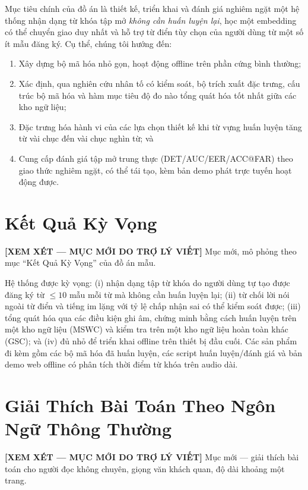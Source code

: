 \documentclass[12pt,a4paper]{report}
\newcommand{\reviewnote}[1]{%
    \par\smallskip\noindent
    \colorbox{yellow!35}{\parbox{0.97\linewidth}{\small\textbf{[XEM XÉT — MỤC MỚI DO TRỢ LÝ VIẾT]}\; #1}}%
    \par\smallskip}
\newcommand{\reviewnote}[1]{}
\begin{document}
Mục tiêu chính của đồ án là thiết kế, triển khai và đánh giá nghiêm ngặt một hệ
thống nhận dạng từ khóa tập mở \emph{không cần huấn luyện lại}, học một embedding
có thể chuyển giao duy nhất và hỗ trợ từ điển tùy chọn của người dùng từ một số
ít mẫu đăng ký. Cụ thể, chúng tôi hướng đến:
\begin{enumerate}[leftmargin=1.5em,itemsep=2pt]
\item Xây dựng bộ mã hóa nhỏ gọn, hoạt động offline trên phần cứng bình thường;
\item Xác định, qua nghiên cứu nhân tố có kiểm soát, bộ trích xuất đặc trưng, cấu
trúc bộ mã hóa và hàm mục tiêu độ đo nào tổng quát hóa tốt nhất giữa các kho ngữ
liệu;
\item Đặc trưng hóa hành vi của các lựa chọn thiết kế khi từ vựng huấn luyện tăng
từ vài chục đến vài chục nghìn từ; và
\item Cung cấp đánh giá tập mở trung thực (DET/AUC/EER/ACC@FAR) theo giao thức
nghiêm ngặt, có thể tái tạo, kèm bản demo phát trực tuyến hoạt động được.
\end{enumerate}

\section{Kết Quả Kỳ Vọng}\label{sec:outcomes}
\reviewnote{Mục mới, mô phỏng theo mục ``Kết Quả Kỳ Vọng'' của đồ án mẫu.}

Hệ thống được kỳ vọng: (i) nhận dạng tập từ khóa do người dùng tự tạo được đăng
ký từ $\le 10$ mẫu mỗi từ mà không cần huấn luyện lại; (ii) từ chối lời nói ngoài
từ điển và tiếng im lặng với tỷ lệ chấp nhận sai có thể kiểm soát được; (iii) tổng
quát hóa qua các điều kiện ghi âm, chứng minh bằng cách huấn luyện trên một kho
ngữ liệu (MSWC) và kiểm tra trên một kho ngữ liệu hoàn toàn khác (GSC); và (iv) đủ
nhỏ để triển khai offline trên thiết bị đầu cuối. Các sản phẩm đi kèm gồm các bộ
mã hóa đã huấn luyện, các script huấn luyện/đánh giá và bản demo web offline có
phân tích thời điểm từ khóa trên audio dài.

\section{Giải Thích Bài Toán Theo Ngôn Ngữ Thông Thường}\label{sec:plain}
\reviewnote{Mục mới --- giải thích bài toán cho người đọc không chuyên, giọng văn
khách quan, độ dài khoảng một trang.}
\end{document}
